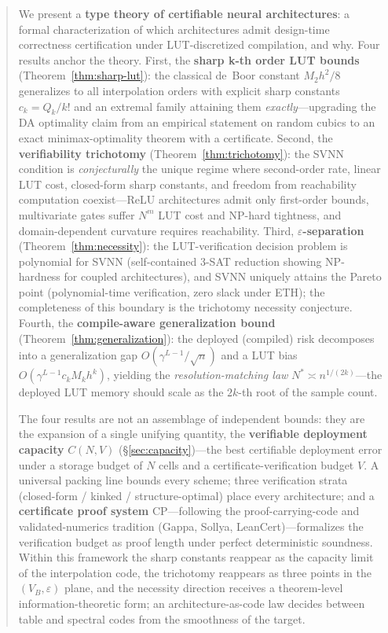 \documentclass[journal,onecolumn]{IEEEtran}
\begin{document}
\begin{abstract}
We present a \textbf{type theory of certifiable neural architectures}:
a formal characterization of which architectures admit design-time
correctness certification under LUT-discretized compilation, and why.
Four results anchor the theory. First, the \textbf{sharp k-th order LUT
bounds} (Theorem~\ref{thm:sharp-lut}): the classical de~Boor constant
$M_2h^2/8$ generalizes to all interpolation orders with explicit sharp
constants $c_k = Q_k/k!$ and an extremal family attaining them
\emph{exactly}---upgrading the DA optimality claim from an empirical
statement on random cubics to an exact minimax-optimality theorem with a
certificate. Second, the \textbf{verifiability trichotomy}
(Theorem~\ref{thm:trichotomy}): the SVNN condition is \emph{conjecturally}
the unique regime where second-order rate, linear LUT cost, closed-form
sharp constants, and freedom from reachability computation
coexist---ReLU
architectures admit only first-order bounds, multivariate gates suffer
$N^m$ LUT cost and NP-hard tightness, and domain-dependent curvature
requires reachability. Third, \textbf{$\varepsilon$-separation}
(Theorem~\ref{thm:necessity}): the LUT-verification decision problem is
polynomial for SVNN (self-contained 3-SAT reduction showing NP-hardness
for coupled architectures), and SVNN uniquely attains the Pareto point
(polynomial-time verification, zero slack under ETH); the completeness
of this boundary is the trichotomy necessity conjecture. Fourth, the \textbf{compile-aware generalization bound}
(Theorem~\ref{thm:generalization}): the deployed (compiled) risk
decomposes into a generalization gap $O(\gamma^{L-1}/\sqrt{n})$ and a
LUT bias $O(\gamma^{L-1}c_kM_kh^k)$, yielding the
\emph{resolution-matching law} $N^{*} \asymp n^{1/(2k)}$---the deployed
LUT memory should scale as the $2k$-th root of the sample count.

The four results are not an assemblage of independent bounds: they are
the expansion of a single unifying quantity, the \textbf{verifiable
deployment capacity} $C(N,V)$ ({\S}\ref{sec:capacity})---the best
certifiable deployment error under a storage budget of $N$ cells and a
certificate-verification budget $V$. A universal packing line bounds
every scheme; three verification strata (closed-form / kinked /
structure-optimal) place every architecture; and a
\textbf{certificate proof system} $\text{CP}$---following the
proof-carrying-code and validated-numerics tradition (Gappa,
Sollya, LeanCert)---formalizes the verification budget as proof length
under perfect deterministic soundness. Within this framework the sharp
constants reappear as the capacity limit of the interpolation code, the
trichotomy reappears as three points in the $(V_B, \varepsilon)$ plane,
and the necessity direction receives a theorem-level
information-theoretic form; an architecture-as-code law decides between
table and spectral codes from the smoothness of the target.


\end{abstract}
\end{document}
